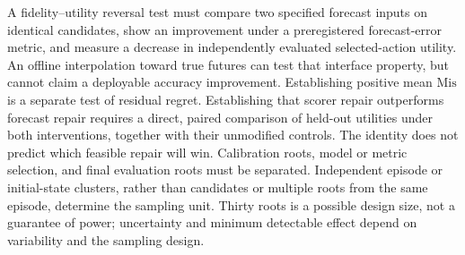 {A fidelity--utility reversal test must compare two specified forecast
inputs on identical candidates, show an improvement under a preregistered
forecast-error metric, and measure a decrease in independently evaluated
selected-action utility. An offline interpolation toward true futures can
test that interface property, but cannot claim a deployable accuracy
improvement. Establishing positive mean $\mathrm{Mis}$ is a separate test
of residual regret. Establishing that scorer repair outperforms forecast
repair requires a direct, paired comparison of held-out utilities under
both interventions, together with their unmodified controls. The identity
does not predict which feasible repair will win. Calibration roots,
model or metric selection, and final evaluation roots must be separated.
Independent episode or initial-state clusters, rather than candidates or
multiple roots from the same episode, determine the sampling unit. Thirty
roots is a possible design size, not a guarantee of power; uncertainty and
minimum detectable effect depend on variability and the sampling design.
}

